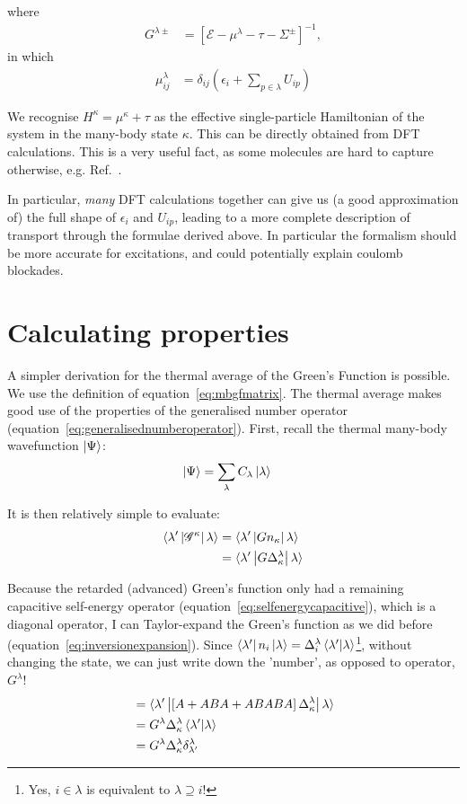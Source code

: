 where 
\begin{align*}
G^{\lambda\pm} &= \left[\mathscr{E} - \mu^\lambda - \tau - \Sigma^\pm \right]^{-1},
\end{align*}
in which
\begin{align}
\mu^\lambda_{ij} &= \delta_{ij} \left( \epsilon_i + \sum_{p\in\lambda} U_{ip} \right) \label{eq:result}
\end{align}

We recognise $H^\kappa = \mu^\kappa + \tau$ as the effective single-particle Hamiltonian of the system in the many-body state $\kappa$. This can be directly obtained from DFT calculations. This is a very useful fact, as some molecules are hard to capture otherwise, e.g. Ref.~\cite{frisenda}.

In particular, \emph{many} DFT calculations together can give us (a good approximation of) the full shape of $\epsilon_i$ and $U_{ip}$, leading to a more complete description of transport through the formulae derived above. In particular the formalism should be more accurate for excitations, and could potentially explain coulomb blockades.

\section{Calculating properties}
\label{sec:calcprop}
A simpler derivation for the thermal average of the Green's Function is possible. We use the definition of equation~\ref{eq:mbgfmatrix}. The thermal average makes good use of the properties of the generalised number operator (equation~\ref{eq:generalisednumberoperator}). First, recall the thermal many-body wavefunction $\ket{\Psi}$:
\begin{align*}
\ket{\Psi} &= \sum_\lambda C_\lambda \ket{\lambda}
\end{align*}

It is then relatively simple to evaluate:
\begin{align*}
\braket{\lambda^\prime \left| \mathscr{G}^\kappa \right| \lambda } &= 
\braket{\lambda^\prime \left|  G n_\kappa \right| \lambda } \\
&= \braket{\lambda^\prime \left| G \Delta^\lambda_\kappa \right| \lambda }
\end{align*}

Because the retarded (advanced) Green's function only had a remaining capacitive self-energy operator (equation~\ref{eq:selfenergycapacitive}), which is a diagonal operator, I can Taylor-expand the Green's function as we did before (equation~\ref{eq:inversionexpansion}). Since $\bra{\lambda'}n_i \ket{\lambda}=\Delta^\lambda_i\braket{\lambda'|\lambda}$\footnote{Yes, $i \in \lambda$ is equivalent to $\lambda\supseteq i$!}, without changing the state, we can just write down the 'number', as opposed to operator,  $G^\lambda$! 
\begin{align*}
&= \braket{\lambda^\prime \left| \left[ A + ABA + ABABA \right] \Delta^\lambda_\kappa \right| \lambda } \\
&=  G^\lambda \Delta^\lambda_\kappa \braket{\lambda^\prime | \lambda }\\
&=  G^\lambda \Delta^\lambda_\kappa \delta^\lambda_{\lambda^\prime}
\end{align*}


